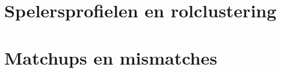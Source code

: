 \section{Spelersprofielen en rolclustering}
\label{sec:lit-profielen}
%

\section{Matchups en mismatches}
\label{sec:lit-mismatches}
%

